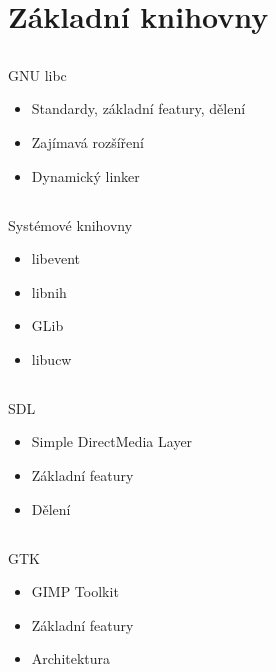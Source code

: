 \documentclass{beamer}
\begin{document}
\section{Základní knihovny}

\subsection{}
\begin{frame}{GNU libc}
\begin{itemize}
\item Standardy, základní featury, dělení
\item Zajímavá rozšíření
\item Dynamický linker
\end{itemize}
\end{frame}

\subsection{}
\begin{frame}{Systémové knihovny}
\begin{itemize}
\item libevent
\item libnih
\item GLib
\item libucw
\end{itemize}
\end{frame}

\subsection{}
\begin{frame}{SDL}
\begin{itemize}
\item Simple DirectMedia Layer
\item Základní featury
\item Dělení
\end{itemize}
\end{frame}

\subsection{}
\begin{frame}{GTK}
\begin{itemize}
\item GIMP Toolkit
\item Základní featury
\item Architektura
\end{itemize}
\end{frame}
\end{document}
